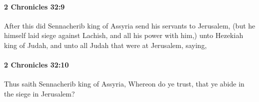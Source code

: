 		\paragraph{2 Chronicles 32:9} %
			\label{2CHRONICLES-32-9}

			After this did Sennacherib king of Assyria send his servants to Jerusalem, (but he himself laid siege against Lachish, and all his power with him,) unto Hezekiah king of Judah, and unto all Judah that were at Jerusalem, saying,


		\paragraph{2 Chronicles 32:10} %
			\label{2CHRONICLES-32-10}

			Thus saith Sennacherib king of Assyria, Whereon do ye trust, that ye abide in the siege in Jerusalem?


